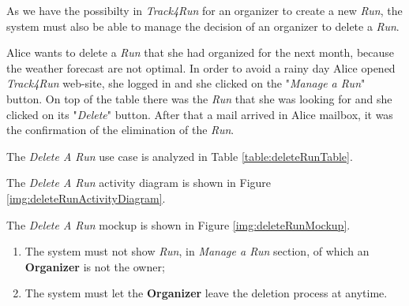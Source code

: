 As we have the possibilty in \textit{Track4Run} for an organizer to create a new \textit{Run}, the system must also be able to manage the decision of an organizer to delete a \textit{Run}.

Alice wants to delete a \textit{Run} that she had organized for the next month, because the weather forecast are not optimal.
In order to avoid a rainy day Alice opened \textit{Track4Run} web-site, she logged in and she clicked on the "\textit{Manage a Run}" button.
On top of the table there was the \textit{Run} that she was looking for and she clicked on its "\textit{Delete}" button.
After that a mail arrived in Alice mailbox, it was the confirmation of the elimination of the \textit{Run}.

The \textit{Delete A Run} use case is analyzed in Table \ref{table:deleteRunTable}.

The \textit{Delete A Run} activity diagram is shown in Figure \ref{img:deleteRunActivityDiagram}.

The \textit{Delete A Run} mockup is shown in Figure \ref{img:deleteRunMockup}.

\begin{enumerate}
  \item The system must not show \textit{Run}, in \textit{Manage a Run} section, of which an \textbf{Organizer} is not the owner;
  \item The system must let the \textbf{Organizer} leave the deletion process at anytime.
\end{enumerate}

